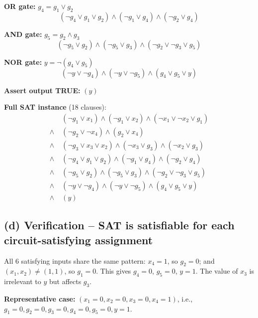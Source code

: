 \documentclass[12pt]{article}
\begin{document}
\noindent\textbf{OR gate:} $g_4 = g_1\lor g_2$
\[(\lnot g_4\lor g_1\lor g_2)\land(\lnot g_1\lor g_4)\land(\lnot g_2\lor g_4)\]

\noindent\textbf{AND gate:} $g_5 = g_2\land g_3$
\[(\lnot g_5\lor g_2)\land(\lnot g_5\lor g_3)\land(\lnot g_2\lor\lnot g_3\lor g_5)\]

\noindent\textbf{NOR gate:} $y = \lnot(g_4\lor g_5)$
\[(\lnot y\lor\lnot g_4)\land(\lnot y\lor\lnot g_5)\land(g_4\lor g_5\lor y)\]

\noindent\textbf{Assert output TRUE:} $(y)$

\medskip
\noindent\textbf{Full SAT instance} (18 clauses):
\begin{align*}
&(\lnot g_1\lor x_1)\land(\lnot g_1\lor x_2)\land(\lnot x_1\lor\lnot x_2\lor g_1)\\
\land\;&(\lnot g_2\lor\lnot x_4)\land(g_2\lor x_4)\\
\land\;&(\lnot g_3\lor x_3\lor x_2)\land(\lnot x_3\lor g_3)\land(\lnot x_2\lor g_3)\\
\land\;&(\lnot g_4\lor g_1\lor g_2)\land(\lnot g_1\lor g_4)\land(\lnot g_2\lor g_4)\\
\land\;&(\lnot g_5\lor g_2)\land(\lnot g_5\lor g_3)\land(\lnot g_2\lor\lnot g_3\lor g_5)\\
\land\;&(\lnot y\lor\lnot g_4)\land(\lnot y\lor\lnot g_5)\land(g_4\lor g_5\lor y)\\
\land\;&(y)
\end{align*}

\subsection*{(d) Verification -- SAT is satisfiable for each circuit-satisfying assignment}

All 6 satisfying inputs share the same pattern: $x_4=1$, so $g_2=0$; and
$(x_1,x_2)\neq(1,1)$, so $g_1=0$.  This gives $g_4=0$, $g_5=0$, $y=1$.
The value of $x_3$ is irrelevant to $y$ but affects $g_3$.

\medskip
\noindent\textbf{Representative case:} $(x_1{=}0,x_2{=}0,x_3{=}0,x_4{=}1)$,
i.e., $g_1{=}0,g_2{=}0,g_3{=}0,g_4{=}0,g_5{=}0,y{=}1$.
\end{document}

